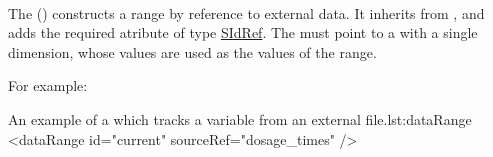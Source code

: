 \begin{blockChanged}
\paragraph{}
\label{class:dataRange}
The  () constructs a range by reference to external data. It inherits from \Range, and adds the required atribute  of type \hyperref[type:sidref]{SIdRef}.  The  must point to a \DataDescription with a single dimension, whose values are used as the values of the range.

For example:

\begin{myXmlLst}{An example of a  which tracks a variable from an external file.}{lst:dataRange}
    <dataRange id="current" sourceRef="dosage_times" />
\end{myXmlLst}
\end{blockChanged}



